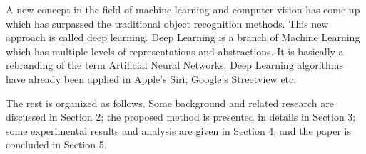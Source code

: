  A new concept in the field of machine learning and computer vision has come up which has surpassed the traditional object recognition methods. This new approach is called deep learning. Deep Learning is a branch of Machine Learning which has multiple levels of representations and abstractions. It is basically a rebranding of the term Artificial Neural Networks. Deep Learning algorithms have already been applied in Apple's Siri, Google's Streetview etc. 

The rest  is organized as follows. Some background and related research are discussed in Section 2; the proposed method is presented in details in Section 3; some experimental results and analysis are given in Section 4; and the paper is concluded in Section 5.
